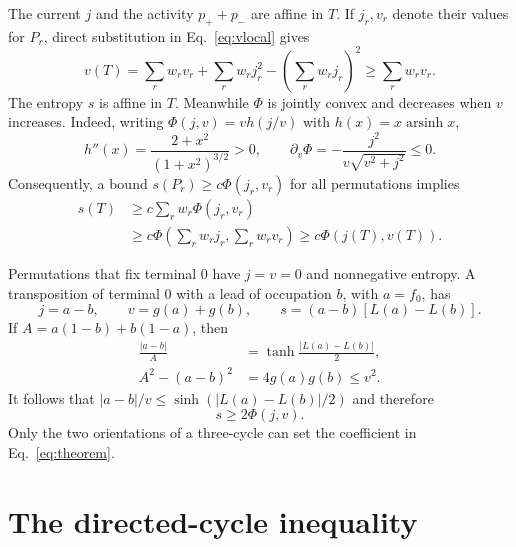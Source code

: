 \documentclass[aps,pra,reprint,superscriptaddress,nofootinbib,longbibliography,floatfix]{revtex4-2}
\newcommand{\asinh}{\operatorname{arsinh}}
\newcommand{\PhiF}{\Phi}
\begin{document}
The current $j$ and the activity $p_++p_-$ are affine in $T$.  If $j_r,v_r$ denote their values for $P_r$, direct substitution in Eq.~\eqref{eq:vlocal} gives
\begin{equation}
 v(T)=\sum_rw_rv_r+\sum_rw_rj_r^2-\left(\sum_rw_rj_r\right)^2
 \geq\sum_rw_rv_r.
 \label{eq:variance-concavity}
\end{equation}
The entropy $s$ is affine in $T$.  Meanwhile $\PhiF$ is jointly convex and decreases when $v$ increases.  Indeed, writing $\PhiF(j,v)=v h(j/v)$ with $h(x)=x\asinh x$,
\begin{equation}
 h''(x)=\frac{2+x^2}{(1+x^2)^{3/2}}>0,
 \qquad
 \partial_v\PhiF=-\frac{j^2}{v\sqrt{v^2+j^2}}\leq0.
 \label{eq:convexity}
\end{equation}
Consequently, a bound $s(P_r)\geq c\PhiF(j_r,v_r)$ for all permutations implies
\begin{align}
 s(T)&\geq c\sum_rw_r\PhiF(j_r,v_r)\nonumber\\
 &\geq c\PhiF\!\left(\sum_rw_rj_r,\sum_rw_rv_r\right)
 \geq c\PhiF(j(T),v(T)).
 \label{eq:mixture}
\end{align}

Permutations that fix terminal 0 have $j=v=0$ and nonnegative entropy.  A transposition of terminal 0 with a lead of occupation $b$, with $a=f_0$, has
\begin{equation}
 j=a-b,\qquad v=g(a)+g(b),\qquad
 s=(a-b)[L(a)-L(b)].
\end{equation}
If $A=a(1-b)+b(1-a)$, then
\begin{align}
 \frac{|a-b|}{A}&=\tanh\frac{|L(a)-L(b)|}{2},\\
 A^2-(a-b)^2&=4g(a)g(b)\leq v^2.
\end{align}
It follows that $|a-b|/v\leq\sinh(|L(a)-L(b)|/2)$ and therefore
\begin{equation}
 s\geq2\PhiF(j,v).
 \label{eq:transposition}
\end{equation}
Only the two orientations of a three-cycle can set the coefficient in Eq.~\eqref{eq:theorem}.

\section{The directed-cycle inequality}
\label{sec:cycle}
\end{document}
